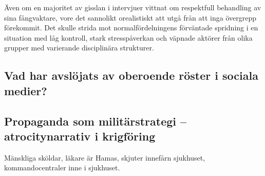 Även om en majoritet av gisslan i intervjuer vittnat om respektfull behandling av sina fångvaktare, vore det sannolikt orealistiskt att utgå från att inga övergrepp förekommit. Det skulle strida mot normalfördelningens förväntade spridning i en situation med låg kontroll, stark stresspåverkan och väpnade aktörer från olika grupper med varierande disciplinära strukturer.


\subsection*{Vad har avslöjats av oberoende röster i sociala medier?}

\subsection*{Propaganda som militärstrategi – atrocitynarrativ i krigföring}

Mänskliga sköldar, läkare är Hamas, skjuter innefårn sjukhuset, kommandocentraler inne i sjukhuset.



